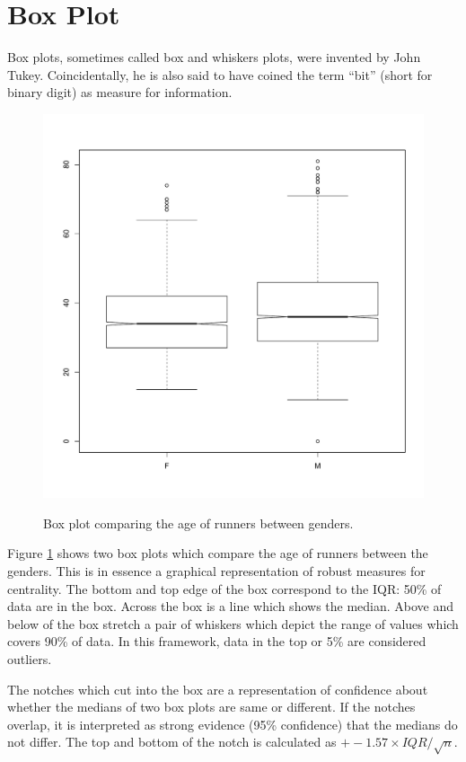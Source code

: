 \documentclass{tufte-book} %
\begin{document}
\section{Box Plot}
Box plots\cite{tukey1977}, sometimes called box and whiskers plots, were invented by John Tukey. Coincidentally, he is also said to have coined the term ``bit'' (short for binary digit) as measure for information. 

\begin{figure}
	\centering
	\includegraphics{graphics/boxplot-age-gender}
	\label{img:boxplot-age-gender}
	\caption{Box plot comparing the age of runners between genders.}
\end{figure}

Figure \ref{img:boxplot-age-gender} shows two box plots which compare the age of runners between the genders. This is in essence a graphical representation of robust measures for centrality. The bottom and top edge of the box correspond to the IQR: 50\% of data are in the box. Across the box is a line which shows the median. Above and below of the box stretch a pair of whiskers which depict the range of values which covers 90\% of data. In this framework, data in the top or 5\% are considered outliers.

The notches\cite{chambers1983} which cut into the box are a representation of confidence about whether the medians of two box plots are same or different. If the notches overlap, it is interpreted as strong evidence (95\% confidence) that the medians do not differ. The top and bottom of the notch is calculated as $+- 1.57 \times IQR /  \sqrt{n}$.
\end{document}
